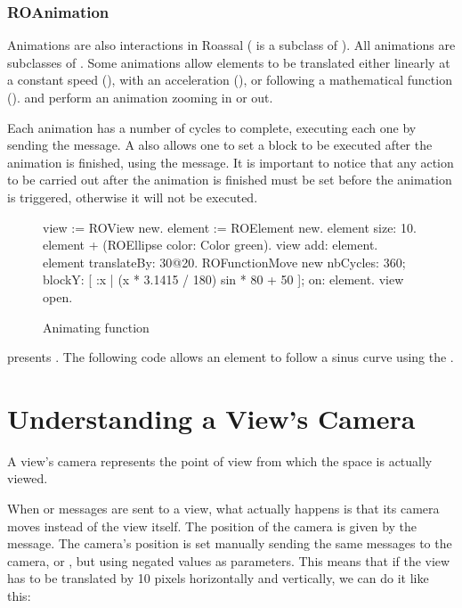 \documentclass[a4paper,10pt,twoside]{book}
\begin{document}
\subsubsection{ROAnimation}
Animations are also interactions in Roassal (\ie {} is a subclass of ). All animations are subclasses of .
 Some animations allow elements to be translated either linearly at a constant speed (), with an acceleration (), or following a mathematical function ().  and  perform an animation zooming in or out. 
 
Each animation has a number of cycles to complete, executing each one by sending the  message.
A  also allows one to set a block to be executed after the animation is finished, using the  message. It is important to notice that any action to be carried out after the animation is finished must be set before the animation is triggered, otherwise it will not be executed. 

\begin{figure}[H]
\begin{code}{}
view := ROView new.
element := ROElement new.
element size: 10.
element + (ROEllipse color: Color green).
view add: element.
element translateBy: 30@20.
ROFunctionMove new
	nbCycles: 360;
	blockY: [ :x | (x * 3.1415 / 180) sin * 80 + 50 ];
	on: element.
view open.
\end{code}
\caption{Animating function}\label{fig:animationCode}
\end{figure}

 presents . The following code allows an element to follow a sinus curve using the .





\section{Understanding a View's Camera} 

A view's camera represents the point of view from which the space is actually viewed. 

When  or  messages are sent to a view, what actually happens is that its camera moves instead of the view itself. The position of the camera is given by the  message. The camera's position is set manually sending the same messages to the camera,  or , but using negated values as parameters. This means that if the view has to be translated by 10 pixels horizontally and vertically, we can do it like this:
\end{document}
